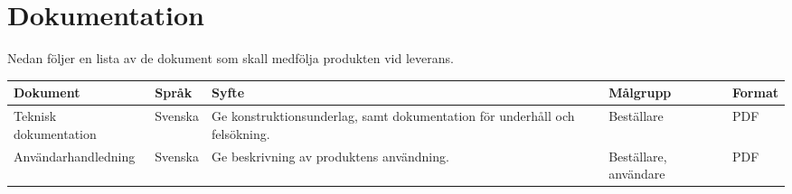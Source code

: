 \documentclass[kravspec/krav.tex]{subfiles}
\begin{document}
\section{Dokumentation}
\label{sec:doc}
Nedan följer en lista av de dokument som skall medfölja produkten vid leverans.
{\renewcommand{\arraystretch}{1.6}
\begin{longtable}{p{4.5cm}p{1.5cm}p{5cm}p{2cm}p{1.2cm}}
    \bfseries Dokument &
    \bfseries Språk &
    \bfseries Syfte &
    \bfseries Målgrupp &
    \bfseries Format \\\hline
    Teknisk dokumentation &
    Svenska &
    Ge konstruktionsunderlag, samt dokumentation för underhåll och
    felsökning. &
    Beställare &
    PDF
    \\
    Användarhandledning &
    Svenska &
    Ge beskrivning av produktens användning. &
    Beställare, användare &
    PDF
    \endhead
\end{longtable}
}
\end{document}
